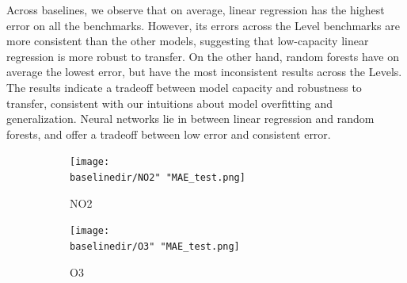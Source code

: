 \documentclass[journal abbreviation, manuscript]{copernicus}
\begin{document}
Across baselines, we observe that on average, linear regression has the highest error on all the benchmarks. However, its errors across the Level benchmarks are more consistent than the other models, suggesting that low-capacity linear regression is more robust to transfer. On the other hand, random forests have on average the lowest error, but have the most inconsistent results across the Levels. The results indicate a tradeoff between model capacity and robustness to transfer, consistent with our intuitions about model overfitting and generalization. Neural networks lie in between linear regression and random forests, and offer a tradeoff between low error and consistent error. 

\begin{figure}[H]
\centering
\begin{subfigure}{0.45\textwidth}
\texttt{[image: \\baselinedir/NO2" "MAE\_test.png]}
\caption{NO2}
\end{subfigure}
\begin{subfigure}{0.45\textwidth}
\texttt{[image: \\baselinedir/O3" "MAE\_test.png]}
\caption{O3}
\end{subfigure}
\caption{}
\label{fig:results-linear}
\end{figure}

\iffalse
\end{document}
